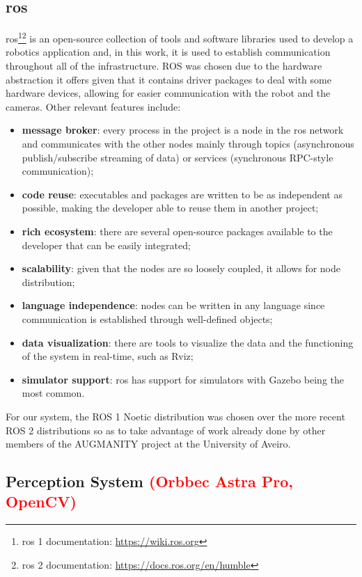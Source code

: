 \subsection{\acf{ros}}

\acs{ros}\cite{ROS2}\footnote{\acs{ros} 1 documentation: \url{https://wiki.ros.org}}\footnote{\acs{ros} 2 documentation: \url{https://docs.ros.org/en/humble}} is an open-source collection of tools and software libraries used to develop a robotics application and, in this work, it is used to establish communication throughout all of the infrastructure. ROS was chosen due to the hardware abstraction it offers given that it contains driver packages to deal with some hardware devices, allowing for easier communication with the robot and the cameras.
Other relevant features include:
\begin{itemize}
    \item \textbf{message broker}: every process in the project is a node in the \acs{ros} network and communicates with the other nodes mainly through topics (asynchronous publish/subscribe streaming of data) or services (synchronous RPC-style communication);
    \item \textbf{code reuse}: executables and packages are written to be as independent as possible, making the developer able to reuse them in another project;
    \item \textbf{rich ecosystem}: there are several open-source packages available to the developer that can be easily integrated;
    \item \textbf{scalability}: given that the nodes are so loosely coupled, it allows for node distribution;
    \item \textbf{language independence}: nodes can be written in any language since communication is established through well-defined objects;
    \item \textbf{data visualization}: there are tools to visualize the data and the functioning of the system in real-time, such as Rviz;
    \item \textbf{simulator support}: \acs{ros} has support for simulators with Gazebo being the most common.
\end{itemize}

For our system, the ROS 1 Noetic distribution was chosen over the more recent ROS 2 distributions so as to take advantage of work already done by other members of the AUGMANITY project at the University of Aveiro.

\subsection{Perception System \textcolor{red}{(Orbbec Astra Pro, OpenCV)}}
\label{subsection:perception_system}

